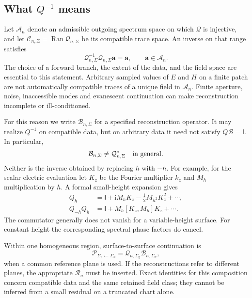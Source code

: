 \documentclass[11pt,a4paper]{article}
\newcommand{\vct}[1]{\bm{#1}}
\newcommand{\ii}{\mathrm i}
\newcommand{\Id}{\mathsf I}
\newcommand{\Q}{\mathcal Q}
\newcommand{\R}{\mathcal R}
\newcommand{\B}{\mathcal B}
\DeclareMathOperator{\Ran}{Ran}
\numberwithin{equation}{section}
\begin{document}
\subsection{What \texorpdfstring{$Q^{-1}$}{Q inverse} means}
\label{sec:inverse}

Let $\mathcal A_n$ denote an admissible outgoing spectrum space on which $\Q$
is injective, and let $\mathcal C_{n,\Sigma}=\Ran\Q_{n,\Sigma}$ be its compatible
trace space. An inverse on that range satisfies
\begin{equation}
 \Q_{n,\Sigma}^{-1}\Q_{n,\Sigma}\vct a=\vct a,
 \qquad \vct a\in\mathcal A_n.
 \label{eq:leftinverse}
\end{equation}
The choice of a forward branch, the extent of the data, and the field space are
essential to this statement. Arbitrary sampled values of $E$ and $H$ on a
finite patch are not automatically compatible traces of a unique field in
$\mathcal A_n$. Finite aperture, noise, inaccessible modes and evanescent
continuation can make reconstruction incomplete or ill-conditioned.

For this reason we write $\B_{n,\Sigma}$ for a specified reconstruction
operator. It may realize $Q^{-1}$ on compatible data, but on arbitrary data it
need not satisfy $Q\B=\Id$. In particular,
\begin{equation}
 \B_{n,\Sigma}\ne\Q_{n,\Sigma}^{*}
 \quad\hbox{in general}.
\end{equation}
Neither is the inverse obtained by replacing $h$ with $-h$. For example, for
the scalar electric evaluation let $K_z$ be the Fourier multiplier $k_z$ and
$M_h$ multiplication by $h$. A formal small-height expansion gives
\begin{align}
 Q_h&=\Id+\ii M_hK_z-\tfrac12M_{h^2}K_z^2+\cdots,\\
 Q_{-h}Q_h&=\Id+M_h[K_z,M_h]K_z+\cdots.
 \label{eq:notnegative}
\end{align}
The commutator generally does not vanish for a variable-height surface. For
constant height the corresponding spectral phase factors do cancel.

Within one homogeneous region, surface-to-surface continuation is
\begin{equation}
 \mathcal P_{\Sigma_b\leftarrow\Sigma_a}
 =\Q_{n,\Sigma_b}\B_{n,\Sigma_a},
 \label{eq:surfacecontinuation}
\end{equation}
when a common reference plane is used. If the reconstructions refer to
different planes, the appropriate $\R_n$ must be inserted. Exact identities
for this composition concern compatible data and the same retained field
class; they cannot be inferred from a small residual on a truncated chart alone.
\end{document}
